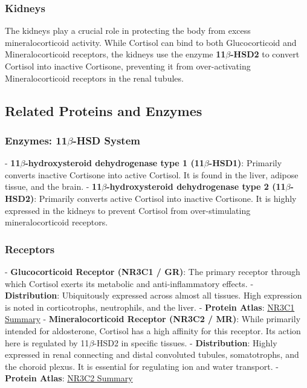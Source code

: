 \documentclass{article}
\begin{document}
\subsubsection{Kidneys}
The kidneys play a crucial role in protecting the body from excess mineralocorticoid activity. While Cortisol can bind to both Glucocorticoid and Mineralocorticoid receptors, the kidneys use the enzyme \textbf{11\texorpdfstring{$\beta$}{beta}-HSD2} to convert Cortisol into inactive Cortisone, preventing it from over-activating Mineralocorticoid receptors in the renal tubules.

\hrulefill

\subsection{Related Proteins and Enzymes}

\subsubsection{Enzymes: 11\texorpdfstring{$\beta$}{beta}-HSD System}
- \textbf{11\texorpdfstring{$\beta$}{beta}-hydroxysteroid dehydrogenase type 1 (11\texorpdfstring{$\beta$}{beta}-HSD1)}: Primarily converts inactive Cortisone into active Cortisol. It is found in the liver, adipose tissue, and the brain.
- \textbf{11\texorpdfstring{$\beta$}{beta}-hydroxysteroid dehydrogenase type 2 (11\texorpdfstring{$\beta$}{beta}-HSD2)}: Primarily converts active Cortisol into inactive Cortisone. It is highly expressed in the kidneys to prevent Cortisol from over-stimulating mineralocorticoid receptors.

\subsubsection{Receptors}
- \textbf{Glucocorticoid Receptor (NR3C1 / GR)}: The primary receptor through which Cortisol exerts its metabolic and anti-inflammatory effects.
    - \textbf{Distribution}: Ubiquitously expressed across almost all tissues. High expression is noted in corticotrophs, neutrophils, and the liver.
    - \textbf{Protein Atlas}: \href{https://www.proteinatlas.org/ENSG00000113580-NR3C1}{NR3C1 Summary}
- \textbf{Mineralocorticoid Receptor (NR3C2 / MR)}: While primarily intended for aldosterone, Cortisol has a high affinity for this receptor. Its action here is regulated by 11\texorpdfstring{$\beta$}{beta}-HSD2 in specific tissues.
    - \textbf{Distribution}: Highly expressed in renal connecting and distal convoluted tubules, somatotrophs, and the choroid plexus. It is essential for regulating ion and water transport.
    - \textbf{Protein Atlas}: \href{https://www.proteinatlas.org/ENSG00000151623-NR3C2}{NR3C2 Summary}
\end{document}
